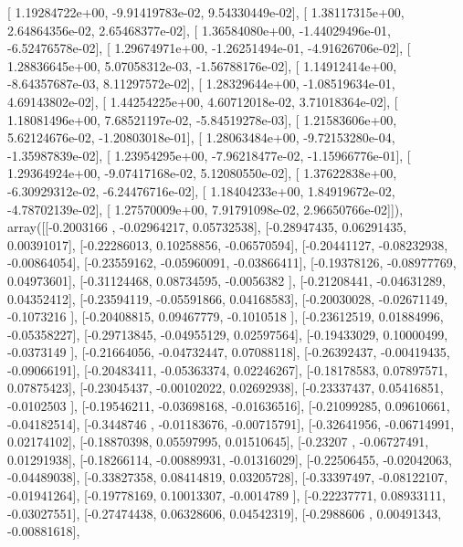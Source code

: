 \documentclass{article}
\begin{document}
       [  1.19284722e+00,  -9.91419783e-02,   9.54330449e-02],
       [  1.38117315e+00,   2.64864356e-02,   2.65468377e-02],
       [  1.36584080e+00,  -1.44029496e-01,  -6.52476578e-02],
       [  1.29674971e+00,  -1.26251494e-01,  -4.91626706e-02],
       [  1.28836645e+00,   5.07058312e-03,  -1.56788176e-02],
       [  1.14912414e+00,  -8.64357687e-03,   8.11297572e-02],
       [  1.28329644e+00,  -1.08519634e-01,   4.69143802e-02],
       [  1.44254225e+00,   4.60712018e-02,   3.71018364e-02],
       [  1.18081496e+00,   7.68521197e-02,  -5.84519278e-03],
       [  1.21583606e+00,   5.62124676e-02,  -1.20803018e-01],
       [  1.28063484e+00,  -9.72153280e-04,  -1.35987839e-02],
       [  1.23954295e+00,  -7.96218477e-02,  -1.15966776e-01],
       [  1.29364924e+00,  -9.07417168e-02,   5.12080550e-02],
       [  1.37622838e+00,  -6.30929312e-02,  -6.24476716e-02],
       [  1.18404233e+00,   1.84919672e-02,  -4.78702139e-02],
       [  1.27570009e+00,   7.91791098e-02,   2.96650766e-02]]), array([[-0.2003166 , -0.02964217,  0.05732538],
       [-0.28947435,  0.06291435,  0.00391017],
       [-0.22286013,  0.10258856, -0.06570594],
       [-0.20441127, -0.08232938, -0.00864054],
       [-0.23559162, -0.05960091, -0.03866411],
       [-0.19378126, -0.08977769,  0.04973601],
       [-0.31124468,  0.08734595, -0.0056382 ],
       [-0.21208441, -0.04631289,  0.04352412],
       [-0.23594119, -0.05591866,  0.04168583],
       [-0.20030028, -0.02671149, -0.1073216 ],
       [-0.20408815,  0.09467779, -0.1010518 ],
       [-0.23612519,  0.01884996, -0.05358227],
       [-0.29713845, -0.04955129,  0.02597564],
       [-0.19433029,  0.10000499, -0.0373149 ],
       [-0.21664056, -0.04732447,  0.07088118],
       [-0.26392437, -0.00419435, -0.09066191],
       [-0.20483411, -0.05363374,  0.02246267],
       [-0.18178583,  0.07897571,  0.07875423],
       [-0.23045437, -0.00102022,  0.02692938],
       [-0.23337437,  0.05416851, -0.0102503 ],
       [-0.19546211, -0.03698168, -0.01636516],
       [-0.21099285,  0.09610661, -0.04182514],
       [-0.3448746 , -0.01183676, -0.00715791],
       [-0.32641956, -0.06714991,  0.02174102],
       [-0.18870398,  0.05597995,  0.01510645],
       [-0.23207   , -0.06727491,  0.01291938],
       [-0.18266114, -0.00889931, -0.01316029],
       [-0.22506455, -0.02042063, -0.04489038],
       [-0.33827358,  0.08414819,  0.03205728],
       [-0.33397497, -0.08122107, -0.01941264],
       [-0.19778169,  0.10013307, -0.0014789 ],
       [-0.22237771,  0.08933111, -0.03027551],
       [-0.27474438,  0.06328606,  0.04542319],
       [-0.2988606 ,  0.00491343, -0.00881618],
\end{document}
